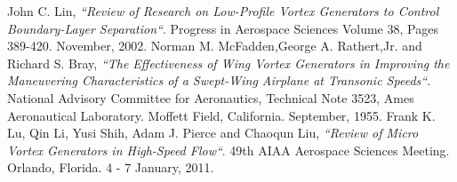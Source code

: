 \documentclass[10pt,a4paper]{article}
\begin{document}
\begin{thebibliography}{99}

  John C. Lin,
  \emph{``Review of Research on Low-Profile Vortex Generators to Control Boundary-Layer Separation``}. Progress in Aerospace Sciences Volume 38, Pages 389-420. November, 2002.
  Norman M. McFadden,George A. Rathert,Jr. and Richard S. Bray,
  \emph{``The Effectiveness of Wing Vortex Generators in Improving the Maneuvering Characteristics of a Swept-Wing Airplane at Transonic Speeds``}. National Advisory Committee for Aeronautics, Technical Note 3523, Ames Aeronautical Laboratory. Moffett Field, California. September, 1955.
Frank K. Lu, Qin Li, Yusi Shih, Adam J. Pierce and Chaoqun Liu,
  \emph{``Review of Micro Vortex Generators
in High-Speed Flow``}. 49th AIAA Aerospace Sciences Meeting. Orlando, Florida. 4 - 7 January, 2011.

\end{thebibliography}
\end{document}
